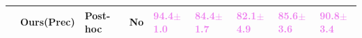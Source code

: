 \begin{table}[t]
\begin{center}
\begin{tabular}{lllllllll}
              & \textbf{Ours(Prec)} & Post-hoc & No & \textcolor{violet}{\textbf{94.4}$\pm$1.0} & \textcolor{violet}{\textbf{84.4}$\pm$1.7} & \textcolor{violet}{\textbf{82.1}$\pm$4.9} &  \textcolor{violet}{\textbf{85.6}$\pm$3.6}&
              \textcolor{violet}{\textbf{90.8}$\pm$3.4} \\
    \toprule
  \end{tabular}
  \label{table:OOD-appendix}
  \end{center}
  \vspace{-1.5em}
\end{table}

